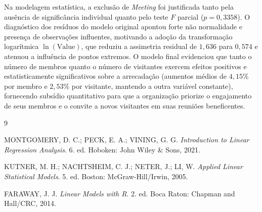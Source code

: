 \documentclass[11pt,a4paper]{article}
\begin{document}
Na modelagem estatística, a exclusão de \textit{Meeting} foi justificada tanto pela ausência de significância individual quanto pelo teste $F$ parcial ($p = 0{,}3358$). O diagnóstico dos resíduos do modelo original apontou forte não normalidade e presença de observações influentes, motivando a adoção da transformação logarítmica $\ln(\text{Value})$, que reduziu a assimetria residual de $1{,}636$ para $0{,}574$ e atenuou a influência de pontos extremos. O modelo final evidenciou que tanto o número de membros quanto o número de visitantes exercem efeitos positivos e estatisticamente significativos sobre a arrecadação (aumentos médios de $4{,}15\%$ por membro e $2{,}53\%$ por visitante, mantendo a outra variável constante), fornecendo subsídio quantitativo para que a organização priorize o engajamento de seus membros e o convite a novos visitantes em suas reuniões beneficentes.

\begin{thebibliography}{9}

MONTGOMERY, D. C.; PECK, E. A.; VINING, G. G. \textit{Introduction to Linear Regression Analysis}. 6. ed. Hoboken: John Wiley \& Sons, 2021.

KUTNER, M. H.; NACHTSHEIM, C. J.; NETER, J.; LI, W. \textit{Applied Linear Statistical Models}. 5. ed. Boston: McGraw-Hill/Irwin, 2005.

FARAWAY, J. J. \textit{Linear Models with R}. 2. ed. Boca Raton: Chapman and Hall/CRC, 2014.

\end{thebibliography}
\end{document}
